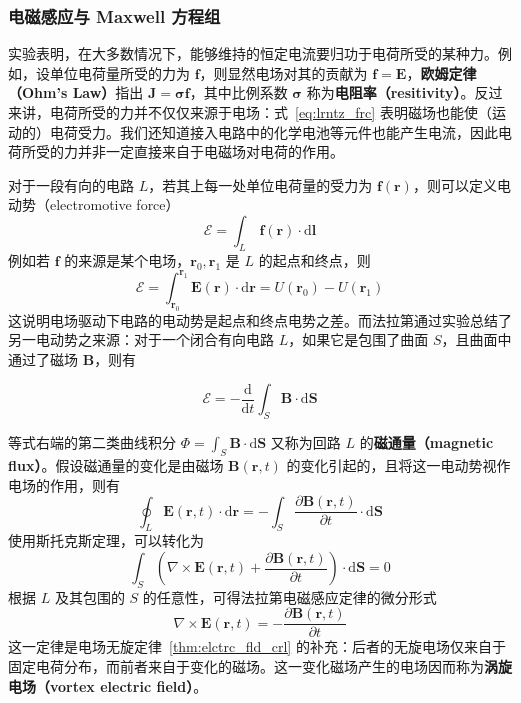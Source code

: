 \documentclass[cn,10pt,math=newtx,citestyle=gb7714-2015,bibstyle=gb7714-2015]{elegantbook}
\def\bm{\boldsymbol}
\def\mbf{\mathbf}
\def\mc{\mathcal}
\def\d{\mathrm d}
\def\p{\partial}
\begin{document}
\subsubsection{电磁感应与 Maxwell 方程组}

实验表明，在大多数情况下，能够维持的恒定电流要归功于电荷所受的某种力。例如，设单位电荷量所受的力为 $\bm f$，则显然电场对其的贡献为 $\bm f=\bm E$，\textbf{欧姆定律（Ohm's Law）}指出 $\bm J=\mbf\sigma\bm f$，其中比例系数 $\mbf\sigma$ 称为\textbf{电阻率（resitivity）}。反过来讲，电荷所受的力并不仅仅来源于电场：式~\ref{eq:lrntz_frc} 表明磁场也能使（运动的）电荷受力。我们还知道接入电路中的化学电池等元件也能产生电流，因此电荷所受的力并非一定直接来自于电磁场对电荷的作用。

对于一段有向的电路 $L$，若其上每一处单位电荷量的受力为 $\bm f(\bm r)$，则可以定义电动势（electromotive force）
\begin{equation*}
    \mc E = \int_L\,\bm f(\bm r)\cdot\bm{\d l}
\end{equation*}
例如若 $\bm f$ 的来源是某个电场，$\bm r_0,\bm r_1$ 是 $L$ 的起点和终点，则
\begin{equation*}
    \mc E = \int_{\bm r_0}^{\bm r_1} \bm E(\bm r)\cdot\bm{\d r}=U(\bm r_0)-U(\bm r_1)
\end{equation*}
这说明电场驱动下电路的电动势是起点和终点电势之差。而法拉第通过实验总结了另一电动势之来源：对于一个闭合有向电路 $L$，如果它是包围了曲面 $S$，且曲面中通过了磁场 $\bm B$，则有

\begin{theorem}
    \begin{equation*}
        \mc E = -\frac{\d}{\d t}\int_S\bm B\cdot\bm {\d S}
    \end{equation*}
\end{theorem}
等式右端的第二类曲线积分 $\Phi=\int_S\bm B\cdot\bm {\d S}$ 又称为回路 $L$ 的\textbf{磁通量（magnetic flux）}。假设磁通量的变化是由磁场 $\bm B(\bm r,t)$ 的变化引起的，且将这一电动势视作电场的作用，则有
\begin{equation*}
    \oint_L\bm E(\bm r,t)\cdot\bm{\d r} = -\int_S\frac{\p\bm B(\bm r,t)}{\p t}\cdot\bm {\d S}
\end{equation*}
使用斯托克斯定理，可以转化为
\begin{equation*}
 \int_S\left(\nabla\times\bm E(\bm r,t) + \frac{\p\bm B(\bm r,t)}{\p t}\right)\cdot\bm {\d S} = 0
\end{equation*}
根据 $L$ 及其包围的 $S$ 的任意性，可得法拉第电磁感应定律的微分形式
\begin{equation}
    \nabla\times\bm E(\bm r,t) = -\frac{\p\bm B(\bm r,t)}{\p t}
\end{equation}
这一定律是电场无旋定律~\ref{thm:elctrc_fld_crl} 的补充：后者的无旋电场仅来自于固定电荷分布，而前者来自于变化的磁场。这一变化磁场产生的电场因而称为\textbf{涡旋电场（vortex electric field）}。
\end{document}
